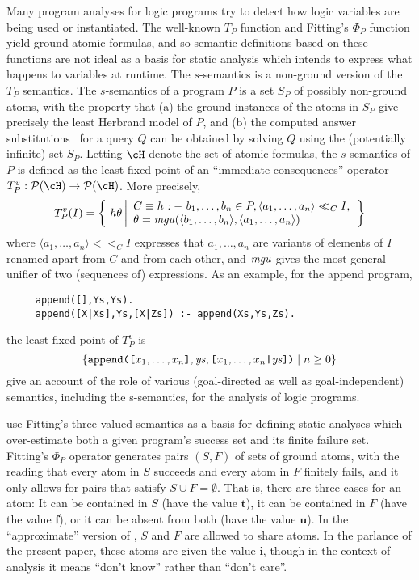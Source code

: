 \documentclass{tlp}
\newcommand{\ident}[1]{\mbox{\textit{#1}}}
\newcommand{\pset}[1]{{\cal P}(#1)}
\newcommand{\sset}[2]{\left\{~#1 \left|
      \begin{array}{l}#2\end{array}
    \right.     \right\}}
\newcommand{\tuple}[1]{\ensuremath{\langle #1 \rangle}}
\newcommand{\ri}{<\!\!\!<}
\begin{document}
Many program analyses for logic programs try to detect how logic
variables are being used or instantiated.
The well-known $T_P$ function and Fitting's $\Phi_P$ function yield 
ground atomic formulas, and so semantic definitions based on these
functions are not ideal as a basis for static analysis which intends 
to express what happens to variables at runtime.
The $s$-semantics \cite{Fal:ssem,Bossi:JLP94} 
is a non-ground version of the $T_P$ semantics.
The $s$-semantics of a program $P$ is a set $S_P$ of possibly
non-ground atoms, with the property that
(a) the ground instances of the atoms in $S_P$ give precisely the least 
Herbrand model of $P$, and 
(b) the computed answer substitutions~\cite{Llo84} for a query $Q$ can 
be obtained by solving $Q$ using the (potentially infinite) set $S_P$.
Letting $\cH$ denote the set of atomic formulas, the $s$-semantics
of $P$ is defined as the least fixed point of an ``immediate
consequences'' operator $T^v_P : \pset{\cH} \rightarrow \pset{\cH}$.
More precisely,
\[
  T^v_P(I) =
      \sset{h\theta} {C\equiv h\ \mathtt{:-}\ b_1,\ldots,b_n \in P,
            \tuple{a_1,\ldots,a_n} \ri_C I, \\
            \theta =
            \ident{mgu}(\tuple{b_1,\ldots,b_n},\tuple{a_1,\ldots,a_n})}
\]
where $\tuple{a_1,\ldots,a_n} \ri_C I$ expresses that $a_1,\ldots,a_n$
are variants of elements of $I$ renamed apart from $C$ and from
each other, and $\ident{mgu}$ gives the most general unifier of two
(sequences of) expressions.
As an example, for the append program,
\begin{verbatim}
     append([],Ys,Ys).
     append([X|Xs],Ys,[X|Zs]) :- append(Xs,Ys,Zs).
\end{verbatim}
the least fixed point of $T^v_P$ is
\[
  \{\mathtt{append}\mbox{\texttt{([}}x_1,\ldots,x_n\mbox{\texttt{]}},\ident{ys},\mbox{\texttt{[}}x_1,\ldots,x_n\mbox{\texttt{|}}\ident{ys}\mbox{\texttt{])}} \mid
       {n \geq 0} \}
\]
 give an account of the role of various
(goal-directed as well as goal-independent) semantics,
including the s-semantics, for the analysis of logic programs.

 use Fitting's three-valued semantics as a basis
for defining static analyses which over-estimate both a given
program's success set and its finite failure set.
Fitting's $\Phi_P$ operator generates pairs $(S,F)$ of
sets of ground atoms, with the reading that every atom in $S$ succeeds
and every atom in $F$ finitely fails, and it only allows for pairs
that satisfy $S \cup F = \emptyset$.
That is, there are three cases for an atom: 
It can be contained in $S$ (have the value $\mathbf{t}$), it can be
contained in $F$ (have the value $\mathbf{f}$), or it can be
absent from both (have the value $\mathbf{u}$).
In the ``approximate'' version of ,
$S$ and $F$ are allowed to share atoms.
In the parlance of the present paper, 
these atoms are given the value $\mathbf{i}$, though in the context of
analysis it means ``don't know'' rather than ``don't care''.
\end{document}
